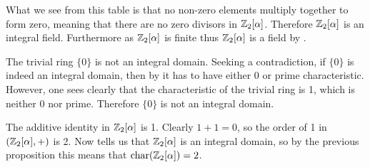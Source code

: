 \begin{questions}
    What we see from this table is that no non-zero elements multiply together to form zero, meaning that there are no zero divisors in $\mathbb{Z}_2[\alpha]$. Therefore $\mathbb{Z}_2[\alpha]$ is an integral field. Furthermore as $\mathbb{Z}_2[\alpha]$ is finite thus $\mathbb{Z}_2[\alpha]$ is a field by .

    \item The trivial ring $\{0\}$ is not an integral domain. Seeking a contradiction, if $\{0\}$ is indeed an integral domain, then by  it has to have either 0 or prime characteristic. However, one sees clearly that the characteristic of the trivial ring is 1, which is neither 0 nor prime. Therefore $\{0\}$ is not an integral domain.

    \item The additive identity in $\mathbb{Z}_2[\alpha]$ is 1. Clearly $1 + 1 = 0$, so the order of 1 in $(\mathbb{Z}_2[\alpha],+)$ is 2. Now  tells us that $\mathbb{Z}_2[\alpha]$ is an integral domain, so by the previous proposition this means that $\mathrm{char}(\mathbb{Z}_2[\alpha]) = 2$.
\end{questions}
